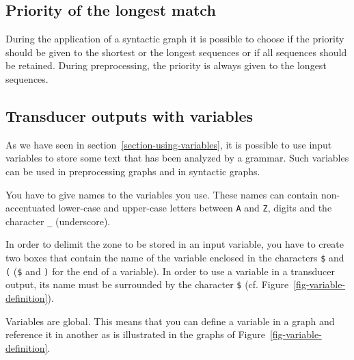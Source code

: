 \subsection{Priority of the longest match}
During the application of a syntactic graph it is possible to choose if the
priority should be given to the shortest or the longest sequences or if all
sequences should be retained. During preprocessing, the priority is always given
to the longest sequences.


\subsection{Transducer outputs with variables}
\label{section-variables}
As we have seen in section~\ref{section-using-variables}, it is
possible to use input variables to store some text that has been analyzed by a
grammar. Such variables can be used in preprocessing graphs and in syntactic
graphs.

\bigskip
\noindent You have to give names to the variables you use. These names can
contain non-accentuated lower-case and upper-case letters between \verb+A+ and \verb+Z+,
digits and the character \verb+_+ (underscore).

\bigskip
\noindent In order to delimit the zone to be stored in an input
variable, you have to create two boxes that contain the name of the variable 
enclosed in the characters \verb-$- and \verb-(- (\verb-$- and \verb-)- for the end of a
variable). In order to use a variable in a transducer output, its name must be
surrounded by the character \verb-$- (cf. Figure~\ref{fig-variable-definition}).

\bigskip
\noindent Variables are global. This means that you can define a variable in a graph and
reference it in another as is illustrated in the graphs of
Figure~\ref{fig-variable-definition}.


